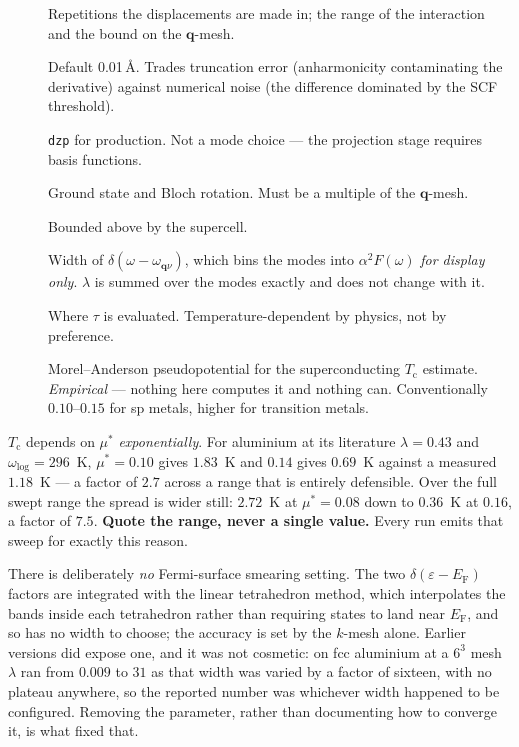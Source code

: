 \begin{description}
  \item[] Repetitions the displacements are made in; the range of
    the interaction and the bound on the $\mathbf{q}$-mesh.
  \item[] Default 0.01\,\AA. Trades truncation error
    (anharmonicity contaminating the derivative) against numerical noise (the
    difference dominated by the SCF threshold).
  \item[] \texttt{dzp} for production. Not a mode choice --- the
    projection stage requires basis functions.
  \item[] Ground state and Bloch rotation. Must be a
    multiple of the $\mathbf{q}$-mesh.
  \item[] Bounded above by the supercell.
  \item[] Width of $\delta(\omega - \omega_{\mathbf{q}\nu})$,
    which bins the modes into $\alpha^2F(\omega)$ \emph{for display only}.
    $\lambda$ is summed over the modes exactly and does not change with it.
  \item[] Where $\tau$ is evaluated. Temperature-dependent by
    physics, not by preference.
  \item[] Morel--Anderson pseudopotential for the
    superconducting $T_\mathrm{c}$ estimate. \emph{Empirical} --- nothing here
    computes it and nothing can. Conventionally $0.10$--$0.15$ for sp metals,
    higher for transition metals.
\end{description}

\begin{calwarn}
$T_\mathrm{c}$ depends on $\mu^*$ \emph{exponentially}. For aluminium at its
literature $\lambda = 0.43$ and $\omega_{\log} = 296$~K, $\mu^* = 0.10$ gives
$1.83$~K and $0.14$ gives $0.69$~K against a measured $1.18$~K --- a factor of
$2.7$ across a range that is entirely defensible. Over the full swept range the
spread is wider still: $2.72$~K at $\mu^* = 0.08$ down to $0.36$~K at $0.16$, a
factor of $7.5$. \textbf{Quote the range, never a single value.} Every run emits
that sweep for exactly this reason.
\end{calwarn}

There is deliberately \emph{no} Fermi-surface smearing setting. The two
$\delta(\varepsilon - E_\mathrm{F})$ factors are integrated with the linear
tetrahedron method, which interpolates the bands inside each tetrahedron
rather than requiring states to land near $E_\mathrm{F}$, and so has no width
to choose; the accuracy is set by the $k$-mesh alone. Earlier versions did
expose one, and it was not cosmetic: on fcc aluminium at a $6^3$ mesh
$\lambda$ ran from $0.009$ to $31$ as that width was varied by a factor of
sixteen, with no plateau anywhere, so the reported number was whichever width
happened to be configured. Removing the parameter, rather than documenting how
to converge it, is what fixed that.

